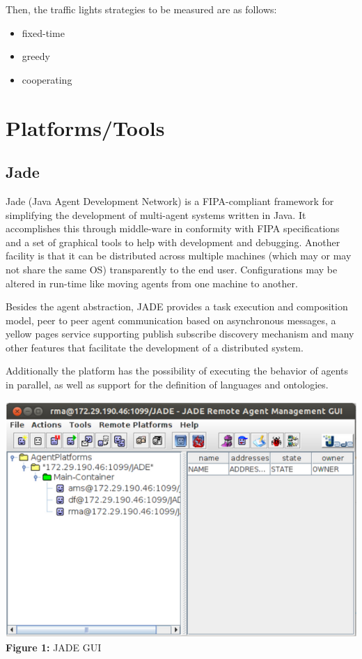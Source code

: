 \documentclass[10pt,a4paper]{article}
\begin{document}
  	Then, the traffic lights strategies to be measured are as follows:
\begin{itemize}
\item fixed-time
\item greedy
\item cooperating
\end{itemize}

\newpage

\section{Platforms/Tools}
\subsection{Jade}
	Jade (Java Agent Development Network) is a FIPA-compliant framework for simplifying  the development of multi-agent systems written in Java. It accomplishes this through middle-ware in conformity with FIPA specifications and a set of graphical tools to help with development and debugging. Another facility is that it can be distributed across multiple machines (which may or may not share the same OS) transparently to the end user. Configurations may be altered in run-time like moving agents from one machine to another.
    
    Besides the agent abstraction, JADE provides a task execution and composition model, peer to peer agent communication based on asynchronous messages, a yellow pages service supporting publish subscribe discovery mechanism and many other features that facilitate the development of a distributed system.
    
    Additionally the platform has the possibility of executing the behavior of agents in parallel, as well as support for the definition of languages and ontologies. 
    
\begin{center}
    \includegraphics[width=1.0\textwidth]{Capture.PNG}
    \textbf{Figure 1:} JADE GUI
\end{center}
\end{document}
